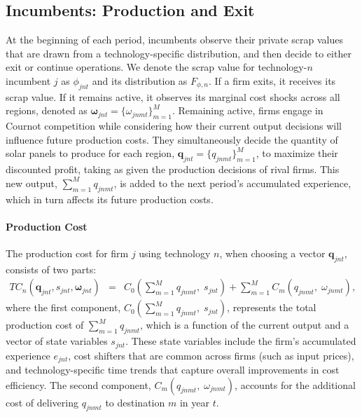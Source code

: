 \documentclass[12pt]{article}
\begin{document}
\subsection{Incumbents: Production and Exit}
At the beginning of each period, incumbents observe their private scrap values that are drawn from a technology-specific distribution, and then decide to either exit or continue operations. We denote the scrap value for technology-$n$ incumbent $j$ as $\phi_{jnt}$ and its distribution as $F_{\phi,n}$. If a firm exits, it receives its scrap value. If it remains active, it observes its marginal cost shocks across all regions, denoted as $\boldsymbol{\omega}_{jnt} =\{\omega_{jnmt}\}_{m=1}^M$. Remaining active, firms engage in Cournot competition while considering how their current output decisions will influence future production costs. They simultaneously decide the quantity of solar panels to produce for each region, $\boldsymbol{q}_{jnt} = \{q_{jnmt}\}_{m=1}^M$, to maximize their discounted profit, taking as given the production decisions of rival firms. This new output, $\sum_{m=1}^M q_{jnmt}$, is added to the next period's accumulated experience, which in turn affects its future production costs.

\paragraph{Production Cost}
The production cost for firm $j$ using technology $n$, when choosing a vector $\boldsymbol{q}_{jnt}$, consists of two parts:
\begin{eqnarray}
   TC_{n}(\boldsymbol{q}_{jnt},s_{jnt},\boldsymbol{\omega}_{jnt})&=& C_0\!\left(\sum_{m=1}^M q_{jnmt},\; s_{jnt}\right) + \sum_{m=1}^M C_m\!\left(q_{jnmt},\; \omega_{jnmt}\right) \label{eq:model_c_q},
\end{eqnarray}
where the first component, $C_0\!\left(\sum_{m=1}^M q_{jnmt},\; s_{jnt}\right)$, represents the total production cost of $\sum_{m=1}^M q_{jnmt}$, which is a function of the current output and a vector of state variables $s_{jnt}$. These state variables include the firm's accumulated experience $e_{jnt}$, cost shifters that are common across firms (such as input prices), and technology-specific time trends that capture overall improvements in cost efficiency. %
The second component, $C_m\!\left(q_{jnmt},\; \omega_{jnmt}\right)$, accounts for the additional cost of delivering $q_{jnmt}$ to destination $m$ in year $t$.
\end{document}

